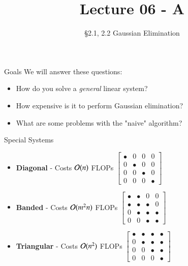 \documentclass[10pt]{beamer}
\title[Math/CS 375]{Lecture 06 - A}
\subtitle{\S 2.1, 2.2 Gaussian Elimination}
\begin{document}
\begin{frame}
  \titlepage
\end{frame}

\begin{frame}{Goals}
We will answer these questions:\\[3mm]
\begin{itemize}
    \item How do you solve a \emph{general} linear system?
    \item How expensive is it to perform Gaussian elimination?
    \item What are some problems with the "naive" algorithm?
\end{itemize}
\end{frame}

\begin{frame}{Special Systems}
    \begin{itemize}
    \item \textbf{Diagonal} - Costs ${\mathcal{O}}(n)$ FLOPs
    $
    \begin{bmatrix}
    \bullet & 0 & 0 & 0 \\
    0 & \bullet & 0 & 0 \\
    0 & 0 & \bullet & 0 \\
    0 & 0 & 0 & \bullet
    \end{bmatrix}
    $ 

    \item \textbf{Banded} - Costs ${\mathcal{O}}(m^2n)$ FLOPs
    $
    \begin{bmatrix}
    \bullet & \bullet & 0 & 0 \\
    \bullet & \bullet & \bullet & 0 \\
    0 & \bullet & \bullet & \bullet \\
    0 & 0 & \bullet & \bullet
    \end{bmatrix}
    $
    
    \item \textbf{Triangular} - Costs ${\mathcal{O}}(n^2)$ FLOPs
    $
    \begin{bmatrix}
    \bullet & \bullet & \bullet & \bullet \\
    0 & \bullet & \bullet & \bullet \\
    0 & 0 & \bullet & \bullet \\
    0 & 0 & 0 & \bullet
    \end{bmatrix}
    $

\end{itemize}
\end{frame}
\end{document}
